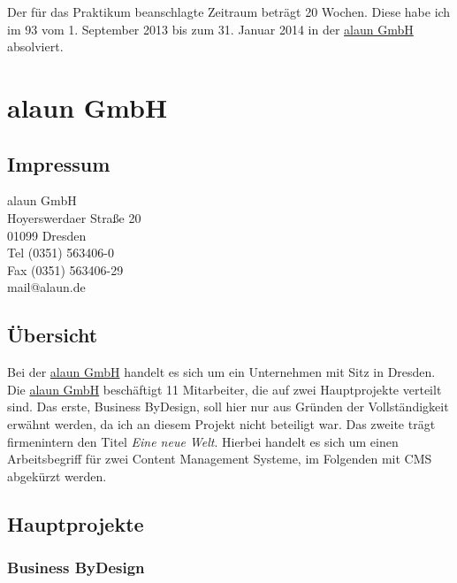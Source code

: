 \documentclass[12pt]{article}
\begin{document}
Der für das Praktikum beanschlagte Zeitraum beträgt 20 Wochen. Diese habe ich im 93 vom 1. September 2013
bis zum 31. Januar 2014 in der \href{https://alaun.de/home/}{alaun GmbH} absolviert.

\section{alaun GmbH}

\subsection{Impressum}

\begin{minipage}{\linewidth}

alaun GmbH \\
Hoyerswerdaer Straße 20 \\
01099 Dresden \\

Tel (0351) 563406-0  \\
Fax (0351) 563406-29 \\

mail@alaun.de 

\end{minipage}

\subsection{Übersicht}

Bei der \href{https://alaun.de/home/}{alaun GmbH} handelt es sich um ein Unternehmen mit Sitz in Dresden.
Die \href{https://alaun.de/home/}{alaun GmbH} beschäftigt 11 Mitarbeiter, die auf zwei Hauptprojekte verteilt
sind. Das erste, Business ByDesign, soll hier nur aus Gründen der Vollständigkeit erwähnt werden, 
da ich an diesem Projekt nicht beteiligt war. Das zweite trägt firmenintern den Titel \textit{Eine neue Welt}.
Hierbei handelt es sich um einen Arbeitsbegriff für zwei Content Management Systeme, im Folgenden mit CMS abgekürzt werden.

\subsection{Hauptprojekte}

\subsubsection{Business ByDesign}
\end{document}
